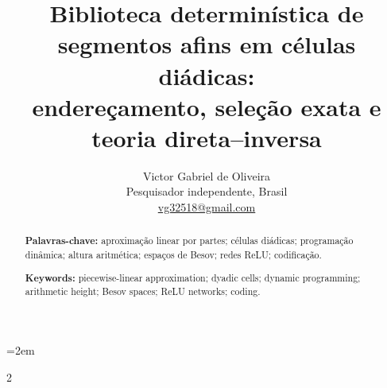 \documentclass[11pt,a4paper]{article}
\title{\textbf{Biblioteca determinística de segmentos afins em células diádicas:}\\
endereçamento, seleção exata e teoria direta--inversa}
\author{Victor Gabriel de Oliveira\\
\small Pesquisador independente, Brasil\\
\small \href{mailto:vg32518@gmail.com}{vg32518@gmail.com}}
\date{}
\theoremstyle{definition}
\theoremstyle{remark}
\begin{document}
\emergencystretch=2em
\maketitle

\renewcommand{\abstractname}{Resumo}
\begin{abstract}


\medskip
\noindent\textbf{Palavras-chave:} aproximação linear por partes; células diádicas; programação dinâmica; altura aritmética; espaços de Besov; redes ReLU; codificação.
\end{abstract}

\renewcommand{\abstractname}{Abstract}
\begin{abstract}


\medskip
\noindent\textbf{Keywords:} piecewise-linear approximation; dyadic cells; dynamic programming; arithmetic height; Besov spaces; ReLU networks; coding.
\end{abstract}























\FloatBarrier




\appendix


\clearpage
\renewcommand{\refname}{Referências}

\begin{multicols}{2}
\footnotesize
\sloppy
\raggedright
\setlength{\bibsep}{0pt}

\end{multicols}
\end{document}
